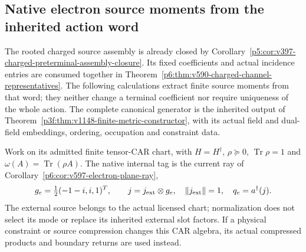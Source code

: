 \documentclass[12pt,a4paper]{article}
\begin{document}

\subsection{Native electron source moments from the inherited action word}
\label{p6:sec:v2189-electron-word-moments}

The rooted charged source assembly is already closed by
Corollary~\ref{p5:cor:v397-charged-preterminal-assembly-closure}.
Its fixed coefficients and actual incidence entries are consumed together
in Theorem~\ref{p6:thm:v590-charged-channel-representatives}.
The following calculations extract finite source moments from that word;
they neither change a terminal coefficient nor require uniqueness of the
whole action. The complete canonical generator is the inherited output of
Theorem~\ref{p3f:thm:v1148-finite-metric-constructor}, with its actual field
and dual-field embeddings, ordering, occupation and constraint data.

Work on its admitted finite tensor-CAR chart, with $H=H^\dagger$,
$\rho\succeq0$, $\operatorname{Tr}\rho=1$ and
$\omega(A)=\operatorname{Tr}(\rho A)$. The native internal tag is
the current ray of Corollary~\ref{p6:cor:v597-electron-plane-ray},
\[
 g_e=\tfrac12(-1-i,i,1)^T,\qquad
 j=j_{\rm ext}\otimes g_e,\quad \|j_{\rm ext}\|=1,\quad
 q_e=a^\dagger(j).
\]
The external source belongs to the actual licensed chart; normalization
does not select its mode or replace its inherited external slot factors.
If a physical constraint or source compression changes this CAR algebra,
its actual compressed products and boundary returns are used instead.
\end{document}
